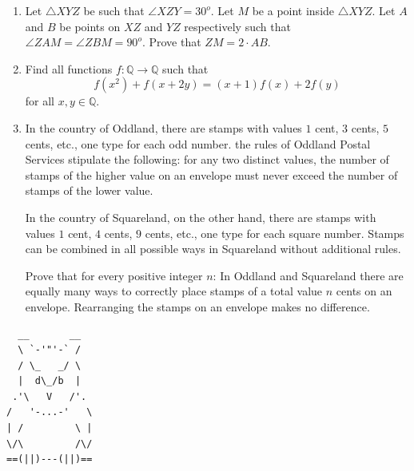 \documentclass{article}
\begin{document}
\begin{enumerate}[1.]
\item %
Let $\triangle XYZ$ be such that $\angle XZY = 30^o$. Let $M$ be a point inside $\triangle XYZ$. Let $A$ and $B$ be points on $XZ$ and $YZ$ respectively such that $\angle ZAM = \angle ZBM = 90^o$. Prove that $ZM = 2 \cdot AB$.

\vfill

\item %
\newcommand{\QQ}{\mathbb{Q}}
Find all functions $f : \QQ \to \QQ$ such that
\[ f(x^2) +f(x+2y) = (x+1)f(x) +2f(y) \]
for all $x, y \in \QQ$. 


\vfill

\item %
In the country of Oddland, there are stamps with values $1$ cent, $3$ cents, $5$ cents, etc., one type for each odd number.
the rules of Oddland Postal Services stipulate the following: for any two distinct values, the number of stamps of the higher value on an envelope must never exceed the number of stamps of the lower value.

In the country of Squareland, on the other hand, there are stamps with values $1$ cent, $4$ cents, $9$ cents, etc., one type for each square number.
Stamps can be combined in all possible ways in Squareland without additional rules.

Prove that for every positive integer $n$:
In Oddland and Squareland there are equally many ways to correctly place stamps of a total value $n$ cents on an envelope.
Rearranging the stamps on an envelope makes no difference.


\end{enumerate}


\vfill
\vfill

\begin{center}
\begin{BVerbatim}
  __       __
  \ `-'"'-` /
  / \_   _/ \
  |  d\_/b  |
 .'\   V   /'.
/   '-...-'   \
| /         \ |
\/\         /\/
==(||)---(||)==
\end{BVerbatim}
\end{center}
\end{document}
